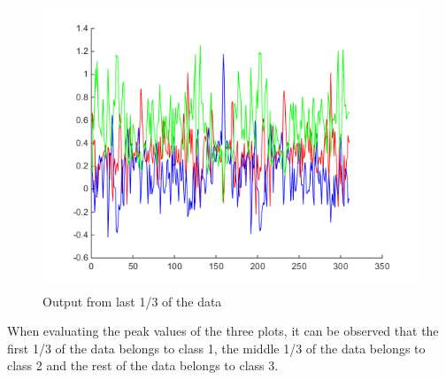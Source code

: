 \begin{figure}[H]
%
  \includegraphics[width=\linewidth]{billeder/oneofkval3}
  \caption{Output from last 1/3 of the data}\label{fig:oneofkval3}
\endminipage
\end{figure}
When evaluating the peak values of the three plots, it can be observed that the first 1/3 of the data belongs to class 1, the middle 1/3 of the data belongs to class 2 and the rest of the data belongs to class 3.

